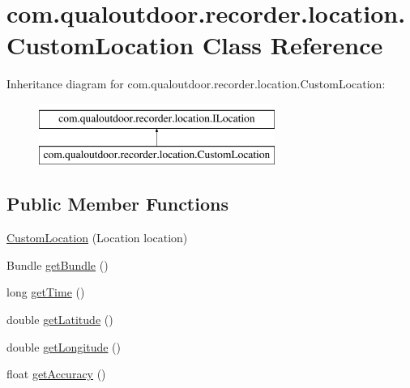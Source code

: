 \hypertarget{classcom_1_1qualoutdoor_1_1recorder_1_1location_1_1CustomLocation}{\section{com.\-qualoutdoor.\-recorder.\-location.\-Custom\-Location Class Reference}
\label{classcom_1_1qualoutdoor_1_1recorder_1_1location_1_1CustomLocation}
}
Inheritance diagram for com.\-qualoutdoor.\-recorder.\-location.\-Custom\-Location\-:\begin{figure}[H]
\begin{center}
\leavevmode
\includegraphics[height=2.000000cm]{classcom_1_1qualoutdoor_1_1recorder_1_1location_1_1CustomLocation}
\end{center}
\end{figure}
\subsection*{Public Member Functions}
\begin{DoxyCompactItemize}
\item 
\hyperlink{classcom_1_1qualoutdoor_1_1recorder_1_1location_1_1CustomLocation_a89981fe330c2dd6278413dce2ce7f15a}{Custom\-Location} (Location location)
\item 
Bundle \hyperlink{classcom_1_1qualoutdoor_1_1recorder_1_1location_1_1CustomLocation_a68f53bfa6a7bf66f5c854c69b2e11356}{get\-Bundle} ()
\item 
long \hyperlink{classcom_1_1qualoutdoor_1_1recorder_1_1location_1_1CustomLocation_ad0df54e3c4f4441427b8cad8ff510810}{get\-Time} ()
\item 
double \hyperlink{classcom_1_1qualoutdoor_1_1recorder_1_1location_1_1CustomLocation_a550c14b23ce30806eb8f975053b839e7}{get\-Latitude} ()
\item 
double \hyperlink{classcom_1_1qualoutdoor_1_1recorder_1_1location_1_1CustomLocation_a30d89fe9fc6fa12b5b02bb5ac2d62975}{get\-Longitude} ()
\item 
float \hyperlink{classcom_1_1qualoutdoor_1_1recorder_1_1location_1_1CustomLocation_af63857c02e401d203882c31ccbf591e6}{get\-Accuracy} ()
\end{DoxyCompactItemize}
